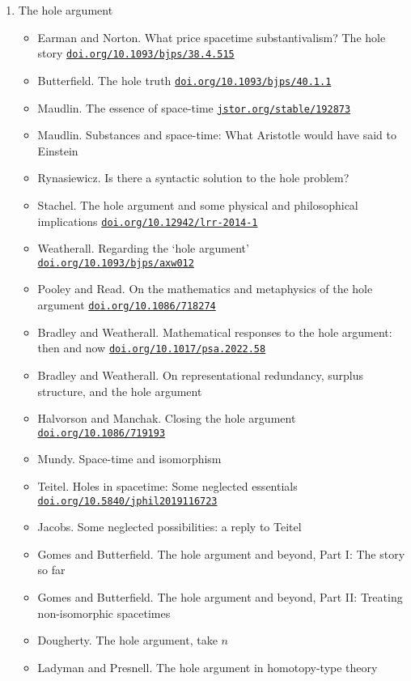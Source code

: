 \documentclass[11pt]{article}
\newcommand\rurl[1]{%
  \href{http://#1}{\nolinkurl{#1}}%
}
\begin{document}
\begin{enumerate}
\item The hole argument
  \begin{itemize}
  \item Earman and Norton. What price spacetime substantivalism? The
    hole story \rurl{doi.org/10.1093/bjps/38.4.515}
  \item Butterfield. The hole truth \rurl{doi.org/10.1093/bjps/40.1.1}
  \item Maudlin. The essence of space-time \rurl{jstor.org/stable/192873}
  \item Maudlin. Substances and space-time: What Aristotle would have
    said to Einstein
  \item Rynasiewicz. Is there a syntactic solution to the hole
    problem?
  \item Stachel. The hole argument and some physical and philosophical
    implications \rurl{doi.org/10.12942/lrr-2014-1}
  \item Weatherall. Regarding the `hole argument'
    \rurl{doi.org/10.1093/bjps/axw012}
  \item Pooley and Read. On the mathematics and metaphysics of the
    hole argument \rurl{doi.org/10.1086/718274}
  \item Bradley and Weatherall. Mathematical responses to the hole
    argument: then and now \rurl{doi.org/10.1017/psa.2022.58}
  \item Bradley and Weatherall. On representational redundancy,
    surplus structure, and the hole argument
  \item Halvorson and Manchak. Closing the hole argument
    \rurl{doi.org/10.1086/719193}
  \item Mundy. Space-time and isomorphism
  \item Teitel. Holes in spacetime: Some neglected essentials
    \rurl{doi.org/10.5840/jphil2019116723}
  \item Jacobs. Some neglected possibilities: a reply to Teitel  
  \item Gomes and Butterfield. The hole argument and beyond, Part I:
    The story so far
  \item Gomes and Butterfield. The hole argument and beyond, Part II:
    Treating non-isomorphic spacetimes 
  \item Dougherty. The hole argument, take $n$
  \item Ladyman and Presnell. The hole argument in homotopy-type
    theory 
  \end{itemize}


\end{enumerate}
\end{document}
